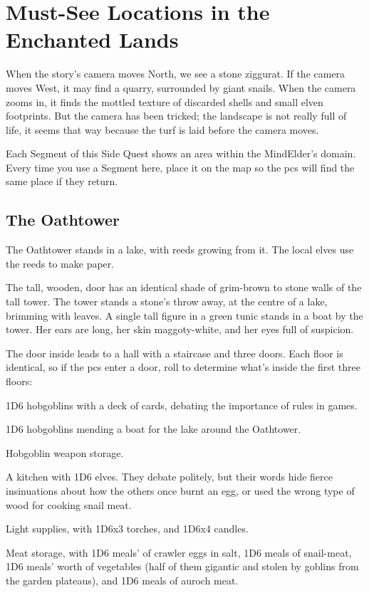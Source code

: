 \section{Must-See Locations in the Enchanted Lands}

When the story's camera moves North, we see a stone ziggurat.
If the camera moves West, it may find a quarry, surrounded by giant snails.
When the camera zooms in, it finds the mottled texture of discarded shells and small elven footprints.
But the camera has been tricked; the landscape is not really full of life, it seems that way because the turf is laid before the camera moves.

Each Segment of this Side Quest shows an area within the \gls{MindElder}'s domain.
Every time you use a Segment here, place it on the map so the \glspl{pc} will find the same place if they return.

\subsection{The Oathtower}

The Oathtower stands in a lake, with reeds growing from it.
The local elves use the reeds to make paper.

\begin{boxtext}
  The tall, wooden, door has an identical shade of grim-brown to stone walls of the tall tower.
  The tower stands a stone's throw away, at the centre of a lake, brimming with leaves.
  A single tall figure in a green tunic stands in a boat by the tower.
  Her ears are long, her skin maggoty-white, and her eyes full of suspicion.
\end{boxtext}

The door inside leads to a hall with a staircase and three doors.
Each floor is identical, so if the \glspl{pc} enter a door, roll to determine what's inside the first three floors:

\begin{dlist}
  \item
  1D6 hobgoblins with a deck of cards, debating the importance of rules in games.
  \item
  1D6 hobgoblins mending a boat for the lake around the Oathtower.
  \item
  Hobgoblin weapon storage.
  \item
  A kitchen with 1D6 elves.  They debate politely, but their words hide fierce insinuations about how the others once burnt an egg, or used the wrong type of wood for cooking snail meat.
  \item
  Light supplies, with 1D6x3 torches, and 1D6x4 candles.
  \item
  Meat storage, with 1D6 meals' of \gls{crawler} eggs in salt, 1D6 meals of snail-meat, 1D6 meals' worth of vegetables (half of them gigantic and stolen by goblins from the garden plateaus), and 1D6 meals of auroch meat.
\end{dlist}

